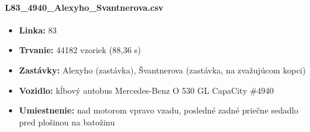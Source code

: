 \paragraph{L83\_4940\_Alexyho\_Svantnerova.csv}
	\begin{itemize}[noitemsep, topsep=0pt]
  	\item \textbf{Linka:} 83
  	\item \textbf{Trvanie:} 44182 vzoriek (88,36 s)
  	\item \textbf{Zastávky:} Alexyho (zastávka), Švantnerova (zastávka, na zvažujúcom kopci)
  	\item \textbf{Vozidlo:} kĺbový autobus Mercedes-Benz O 530 GL CapaCity \#4940
  	\item \textbf{Umiestnenie:} nad motorom vpravo vzadu, posledné zadné priečne sedadlo pred plošinou na batožinu
  	\end{itemize}